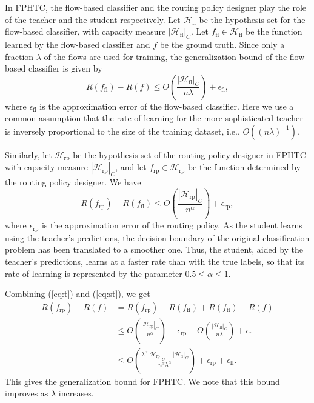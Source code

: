 In FPHTC, the flow-based classifier and the routing policy designer play the role of the teacher and the student respectively. Let $\mathcal{H}_\text{fl}$ be the hypothesis set for the flow-based classifier, with capacity measure $|\mathcal{H}_\text{fl}|_C$. Let $f_\text{fl}\in\mathcal{H}_\text{fl}$ be the function learned by the flow-based classifier and $f$ be the ground truth. Since only a fraction $\lambda$ of the flows are used for training, the generalization bound of the flow-based classifier is given by
\begin{equation}
R(f_\text{fl})-R(f)\leq O\left(\frac{|\mathcal{H}_\text{fl}|_C}{n\lambda}\right) + \epsilon_\text{fl},
\label{eq:t}
\end{equation}       
where $\epsilon_\text{fl}$ is the approximation error of the flow-based classifier. Here we use a common assumption that the rate of learning for the more sophisticated teacher is inversely proportional to the size of the training dataset, i.e., $O((n\lambda)^{-1})$. 

Similarly, let $\mathcal{H}_\text{rp}$ be the hypothesis set of the routing policy designer in FPHTC with capacity measure $|\mathcal{H}_\text{rp}|_C$, and let $f_\text{rp} \in \mathcal{H}_\text{rp}$ be the function determined by the routing policy designer.  We have   
\begin{equation}
R(f_\text{rp})-R(f_\text{fl})\leq O\left(\frac{|\mathcal{H}_\text{rp}|_C}{n^\alpha}\right) + \epsilon_\text{rp},
\label{eq:st}
\end{equation}
where $\epsilon_\text{rp}$ is the approximation error of the routing policy. As the student learns using the teacher's predictions, the decision boundary of the original classification problem has been translated to a smoother one. Thus, the student, aided by the teacher's predictions, learns at a faster rate than with the true labels, so that its rate of learning is represented by the parameter $0.5\leq\alpha\leq 1$. 

Combining (\ref{eq:t}) and (\ref{eq:st}), we get
\begin{equation}
\begin{split}
R(f_\text{rp})-R(f)&=R(f_\text{rp})-R(f_\text{fl})+R(f_\text{fl})-R(f)\\
&\leq O\left(\frac{|\mathcal{H}_\text{rp}|_C}{n^\alpha}\right) + \epsilon_\text{rp} + O\left(\frac{|\mathcal{H}_\text{fl}|_C}{n\lambda}\right) + \epsilon_\text{fl}\\
&\leq O\left(\frac{\lambda^\alpha|\mathcal{H}_\text{rp}|_C+|\mathcal{H}_\text{fl}|_C}{n^\alpha\lambda^\alpha}\right) + \epsilon_\text{rp}+ \epsilon_\text{fl}.
\end{split}
\label{eq:kd}
\end{equation}
This gives the generalization bound for FPHTC. We note that this bound improves as $\lambda$ increases. 

